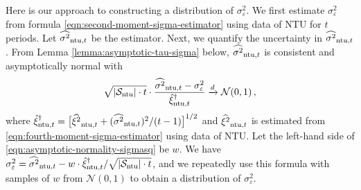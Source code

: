 {Here is our approach to constructing a  distribution of $\sigma_\varepsilon^2$. We first estimate $\sigma_\varepsilon^2$ from formula \eqref{eqn:second-moment-sigma-estimator} using data of NTU for $t$ periods. Let $\widehat{\sigma^2}_{\mathrm{ntu},t}$ be the estimator. Next, we quantify the uncertainty in $\widehat{\sigma^2}_{\mathrm{ntu},t}$. From Lemma \ref{lemma:asymptotic-tau-sigma} below, $\widehat{\sigma^2}_{\mathrm{ntu},t}$ is consistent and asymptotically normal with
\begin{align}
    \sqrt{|\mathcal{S}_{\mathrm{ntu}}| \cdot t} \cdot \frac{\widehat{\sigma^2}_{\mathrm{ntu},t} - \sigma_\varepsilon^2 }{\hat{\xi}_{\mathrm{ntu},t}^{\dagger} }   \xrightarrow{d} \mathcal{N}(0,1)\,, \label{eqn:asymptotic-normality-sigmasq}
\end{align}
where $\hat{\xi}_{\mathrm{ntu},t}^{\dagger} = \big[\widehat{\xi^2}_{\mathrm{ntu},t} + (\widehat{\sigma^2}_{\mathrm{ntu},t})^2/(t-1) \big]^{1/2}$ and $\widehat{\xi^2}_{\mathrm{ntu},t}$ is estimated from \eqref{eqn:fourth-moment-sigma-estimator} using data of NTU. Let the left-hand side of \eqref{eqn:asymptotic-normality-sigmasq} be $w$. We have $\sigma_\varepsilon^2 = \widehat{\sigma^2}_{\mathrm{ntu},t} - w \cdot {\hat{\xi}^\dagger_{\mathrm{ntu},t}}/{\sqrt{|\mathcal{S}_{\mathrm{ntu}}| \cdot t}}$, and we repeatedly use this formula with samples of $w$ from $\mathcal{N}(0,1)$ to obtain a  distribution of $\sigma_\varepsilon^2$. 

}

